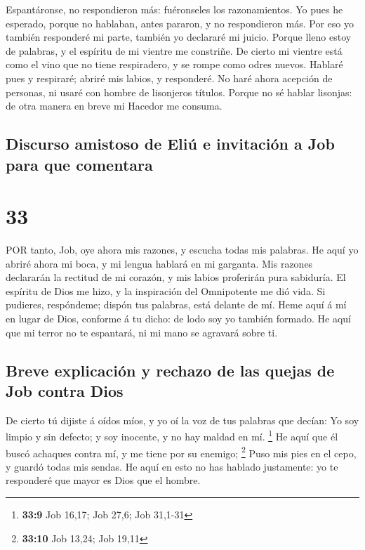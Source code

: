  Espantáronse, no respondieron más: fuéronseles los
razonamientos.  Yo pues he esperado, porque no hablaban,
antes pararon, y no respondieron más.  Por eso yo también
responderé mi parte, también yo declararé mi juicio. 
Porque lleno estoy de palabras, y el espíritu de mi vientre me
constriñe.  De cierto mi vientre está como el vino que no
tiene respiradero, y se rompe como odres nuevos.  Hablaré
pues y respiraré; abriré mis labios, y responderé.  No haré
ahora acepción de personas, ni usaré con hombre de lisonjeros títulos.
 Porque no sé hablar lisonjas: de otra manera en breve mi
Hacedor me consuma.

\hypertarget{discurso-amistoso-de-eliuxfa-e-invitaciuxf3n-a-job-para-que-comentara}{%
\subsection{Discurso amistoso de Eliú e invitación a Job para que
comentara}\label{discurso-amistoso-de-eliuxfa-e-invitaciuxf3n-a-job-para-que-comentara}}

\hypertarget{section-32}{%
\section{33}\label{section-32}}

 POR tanto, Job, oye ahora mis razones, y escucha todas mis
palabras.  He aquí yo abriré ahora mi boca, y mi lengua
hablará en mi garganta.  Mis razones declararán la rectitud
de mi corazón, y mis labios proferirán pura sabiduría.  El
espíritu de Dios me hizo, y la inspiración del Omnipotente me dió vida.
 Si pudieres, respóndeme; dispón tus palabras, está delante
de mí.  Heme aquí á mí en lugar de Dios, conforme á tu
dicho: de lodo soy yo también formado.  He aquí que mi
terror no te espantará, ni mi mano se agravará sobre ti.

\hypertarget{breve-explicaciuxf3n-y-rechazo-de-las-quejas-de-job-contra-dios}{%
\subsection{Breve explicación y rechazo de las quejas de Job contra
Dios}\label{breve-explicaciuxf3n-y-rechazo-de-las-quejas-de-job-contra-dios}}

 De cierto tú dijiste á oídos míos, y yo oí la voz de tus
palabras que decían:  Yo soy limpio y sin defecto; y soy
inocente, y no hay maldad en mí. \footnote{\textbf{33:9} Job 16,17; Job
  27,6; Job 31,1-31}  He aquí que él buscó achaques contra
mí, y me tiene por su enemigo; \footnote{\textbf{33:10} Job 13,24; Job
  19,11}  Puso mis pies en el cepo, y guardó todas mis
sendas.  He aquí en esto no has hablado justamente: yo te
responderé que mayor es Dios que el hombre.

